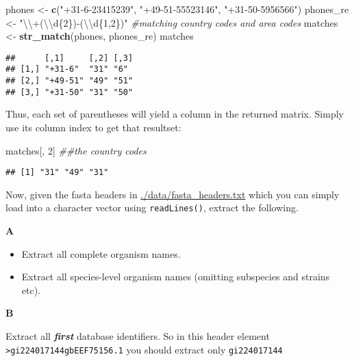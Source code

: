 \documentclass[]{book}
\newenvironment{Shaded}{\begin{snugshade}}{\end{snugshade}}
\newcommand{\CharTok}[1]{\textcolor[rgb]{0.31,0.60,0.02}{#1}}
\newcommand{\CommentTok}[1]{\textcolor[rgb]{0.56,0.35,0.01}{\textit{#1}}}
\newcommand{\DecValTok}[1]{\textcolor[rgb]{0.00,0.00,0.81}{#1}}
\newcommand{\KeywordTok}[1]{\textcolor[rgb]{0.13,0.29,0.53}{\textbf{#1}}}
\newcommand{\NormalTok}[1]{#1}
\newcommand{\StringTok}[1]{\textcolor[rgb]{0.31,0.60,0.02}{#1}}
\providecommand{\tightlist}{%
  \setlength{\itemsep}{0pt}\setlength{\parskip}{0pt}}
\begin{document}
\begin{Shaded}
\begin{Highlighting}[]
\NormalTok{phones <-}\StringTok{ }\KeywordTok{c}\NormalTok{(}\StringTok{"+31-6-23415239"}\NormalTok{, }\StringTok{"+49-51-55523146"}\NormalTok{, }\StringTok{"+31-50-5956566"}\NormalTok{)}
\NormalTok{phones_re <-}\StringTok{ "}\CharTok{\textbackslash{}\textbackslash{}}\StringTok{+(}\CharTok{\textbackslash{}\textbackslash{}}\StringTok{d\{2\})-(}\CharTok{\textbackslash{}\textbackslash{}}\StringTok{d\{1,2\})"} \CommentTok{#matching country codes and area codes}
\NormalTok{matches <-}\StringTok{ }\KeywordTok{str_match}\NormalTok{(phones, phones_re) }
\NormalTok{matches}
\end{Highlighting}
\end{Shaded}

\begin{verbatim}
##      [,1]     [,2] [,3]
## [1,] "+31-6"  "31" "6" 
## [2,] "+49-51" "49" "51"
## [3,] "+31-50" "31" "50"
\end{verbatim}

Thus, each set of parentheses will yield a column in the returned matrix. Simply use its column index to get that resultset:

\begin{Shaded}
\begin{Highlighting}[]
\NormalTok{matches[, }\DecValTok{2}\NormalTok{] }\CommentTok{##the country codes}
\end{Highlighting}
\end{Shaded}

\begin{verbatim}
## [1] "31" "49" "31"
\end{verbatim}

Now, given the fasta headers in \url{./data/fasta_headers.txt}
which you can simply load into a character vector using \texttt{readLines()}, extract the following.

\textbf{A}

\begin{itemize}
\tightlist
\item
  Extract all complete organism names.\\
\item
  Extract all species-level organism names (omitting subspecies and strains etc).
\end{itemize}

\textbf{B}

Extract all \textbf{\emph{first}} database identifiers. So in this header element \texttt{\textgreater{}gi\textbar{}224017144\textbar{}gb\textbar{}EEF75156.1\textbar{}} you should extract only \texttt{gi\textbar{}224017144}
\end{document}
